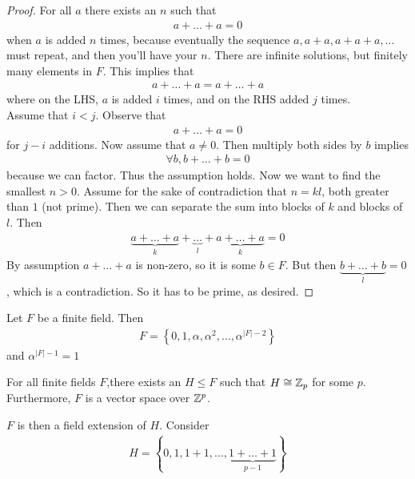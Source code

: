 \documentclass{memoir}
\begin{document}
\begin{proof}
For all \(a\) there exists an \(n\) such that
\begin{align*}
	a+\ldots+a = 0
\end{align*}
when \(a\) is added \(n\) times, because eventually the sequence \(a, a+a, a+a+a, \ldots\) must repeat, and then you'll have your \(n\). There are infinite solutions, but finitely many elements in \(F\). This implies that
\begin{align*}
	a + \ldots + a = a + \ldots + a
\end{align*}
where on the LHS, \(a\) is added \(i\) times, and on the RHS added \(j\) times.\\
Assume that \(i < j\). Observe that
\begin{align*}
	a + \ldots + a = 0
\end{align*}
for \(j-i\) additions. Now assume that \(a \neq 0\). Then multiply both sides by \(b\) implies
\begin{align*}
	\forall b, b + \ldots + b = 0
\end{align*}
because we can factor. Thus the assumption holds. Now we want to find the smallest \(n>0\). Assume for the sake of contradiction that \(n = kl\), both greater than \(1\) (not prime). Then we can separate the sum into blocks of \(k\) and blocks of \(l\). Then
\begin{align*}
	\underbrace{a+\ldots+a}_k + \underbrace{\ldots}_{l} + \underbrace{a+\ldots+a}_k = 0
\end{align*}
By assumption  \(a+\ldots+a\) is non-zero, so it is some \(b \in F\). But then \(\underbrace{b+\ldots+b}_l = 0\), which is a contradiction. So it has to be prime, as desired.
\end{proof}
\begin{thm}
	Let \(F\) be a finite field. Then
	\begin{align*}
		F = \left\{ 0,1,\alpha,\alpha^2,\ldots,\alpha ^{\left| F \right| -2}\right\} 
	\end{align*}
	and \(\alpha ^{\left| F \right| -1} = 1\)
\end{thm}
\begin{thm}
	For all finite fields \(F\),there exists an \(H\leq F\) such that \(H \cong \mathbb{Z}_p\) for some \(p\). Furthermore, \(F\) is a vector space over \(\mathbb{Z}^{p}\).
\end{thm}
\(F\) is then a field extension of \(H\).
Consider
\begin{align*}
	H = \left\{ 0,1,1+1,\ldots,\underbrace{1+\ldots+1}_{p-1} \right\} 
\end{align*}
\end{document}
